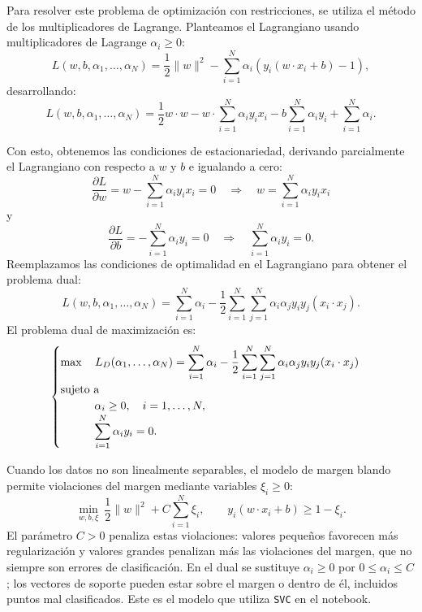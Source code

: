 \documentclass[a4,11pt]{aleph-notas}
\begin{document}
Para resolver este problema de optimización con restricciones, se utiliza el método de los multiplicadores de Lagrange. Planteamos el Lagrangiano usando multiplicadores de Lagrange $\alpha_i \geq 0$:
\[
    L({w}, b, {\alpha_1},\ldots,\alpha_N) = \frac{1}{2} \|{w}\|^2 - \sum_{i=1}^N \alpha_i \left( y_i ({w} \cdot {x}_i + b) - 1 \right),
\]
desarrollando:
\[
    L({w}, b, {\alpha_1},\ldots,\alpha_N) = \frac{1}{2} {w} \cdot {w} - {w} \cdot \sum_{i=1}^N \alpha_i y_i {x}_i - b \sum_{i=1}^N \alpha_i y_i + \sum_{i=1}^N \alpha_i.
\]

Con esto, obtenemos las condiciones de estacionariedad, derivando parcialmente el Lagrangiano con respecto a ${w}$ y $b$ e igualando a cero:
\[
    \frac{\partial L}{\partial {w}} = {w} - \sum_{i=1}^N \alpha_i y_i {x}_i = 0 \quad \Rightarrow \quad {w} = \sum_{i=1}^N \alpha_i y_i {x}_i
\]
y
\[
    \frac{\partial L}{\partial b} = - \sum_{i=1}^N \alpha_i y_i = 0 \quad \Rightarrow \quad \sum_{i=1}^N \alpha_i y_i = 0.
\]
Reemplazamos las condiciones de optimalidad en el Lagrangiano para obtener el problema dual:
\[
    L({w}, b, {\alpha_1},\ldots,\alpha_N) = \sum_{i=1}^N \alpha_i - \frac{1}{2} \sum_{i=1}^N \sum_{j=1}^N \alpha_i \alpha_j y_i y_j ({x}_i \cdot {x}_j).
\]
El problema dual de maximización es:
\[
    \begin{cases}
        \max \quad \displaystyle L_D({\alpha_1},\ldots,\alpha_N) = \sum_{i=1}^N \alpha_i - \frac{1}{2} \sum_{i=1}^N \sum_{j=1}^N \alpha_i \alpha_j y_i y_j ({x}_i \cdot {x}_j) \\
        \text{sujeto a}\\ 
        \qquad\quad \alpha_i \geq 0, \quad i = 1,\ldots, N,\\
        \qquad\quad \displaystyle\sum_{i=1}^N \alpha_i y_i = 0.
    \end{cases}
\]

Cuando los datos no son linealmente separables, el modelo de margen blando permite violaciones del margen mediante variables $\xi_i \geq 0$:
\[
    \min_{w,b,\xi}\ \frac{1}{2}\|w\|^2+C\sum_{i=1}^N\xi_i,
    \qquad y_i(w\cdot x_i+b)\geq 1-\xi_i.
\]
El parámetro $C>0$ penaliza estas violaciones: valores pequeños favorecen más regularización y valores grandes penalizan más las violaciones del margen, que no siempre son errores de clasificación. En el dual se sustituye $\alpha_i\geq 0$ por $0\leq\alpha_i\leq C$; los vectores de soporte pueden estar sobre el margen o dentro de él, incluidos puntos mal clasificados. Este es el modelo que utiliza \texttt{SVC} en el notebook.
\end{document}
